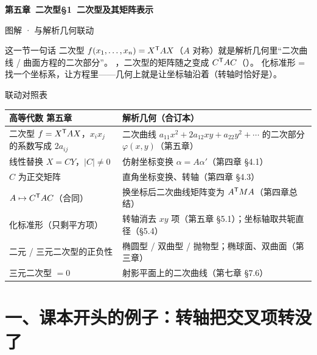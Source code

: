 \documentclass[11pt,a4paper,oneside,openany,fontset=none]{ctexbook}
\begin{document}
\pagestyle{fancy}

\begin{center}
{\sffamily\bfseries\LARGE\color{mainblue} 第五章\ 二次型\quad §1\ 二次型及其矩阵表示\par}
\vspace{4pt}
{\sffamily\large 图解 · 与解析几何联动\par}
\vspace{4pt}{\color{mainblue}\rule{\textwidth}{0.8pt}}
\end{center}

\begin{intbox}{这一节一句话}
二次型 $f(x_1,\dots,x_n)=X^{\mathsf T} AX$（$A$ 对称）就是解析几何里“二次曲线 / 曲面方程的二次部分”。
，二次型的矩阵随之变成 $C^{\mathsf T} AC$（）。
化标准形 = 找一个坐标系，让方程里——几何上就是让坐标轴沿着（转轴时恰好是）。
\end{intbox}

\begin{gdbox}{联动对照表}
\renewcommand{\arraystretch}{1.25}
\begin{tabularx}{\linewidth}{@{}>{\raggedright\arraybackslash}X>{\raggedright\arraybackslash}X@{}}
\toprule
\textbf{\sffamily 高等代数 第五章} & \textbf{\sffamily 解析几何（合订本）}\\\midrule
二次型 $f=X^{\mathsf T} AX$，$x_ix_j$ 的系数写成 $2a_{ij}$ & 二次曲线 $a_{11}x^2+2a_{12}xy+a_{22}y^2+\cdots$ 的二次部分 $\varphi(x,y)$（第五章）\\
线性替换 $X=CY$，$|C|\ne0$ & 仿射坐标变换 $\alpha=A\alpha'$（第四章 \S4.1）\\
$C$ 为正交矩阵 & 直角坐标变换、转轴（第四章 \S4.3）\\
$A\mapsto C^{\mathsf T} AC$（合同） & 换坐标后二次曲线矩阵变为 $A^{\mathsf T} MA$（第四章总结）\\
化标准形（只剩平方项） & 转轴消去 $xy$ 项（第五章 \S5.1）；坐标轴取共轭直径（\S5.4）\\
二元 / 三元二次型的正负性 & 椭圆型 / 双曲型 / 抛物型；椭球面、双曲面（第三章）\\
三元二次型 $=0$ & 射影平面上的二次曲线（第七章 \S7.6）\\
\bottomrule
\end{tabularx}
\end{gdbox}

\section*{一、课本开头的例子：转轴把交叉项转没了}
\end{document}
